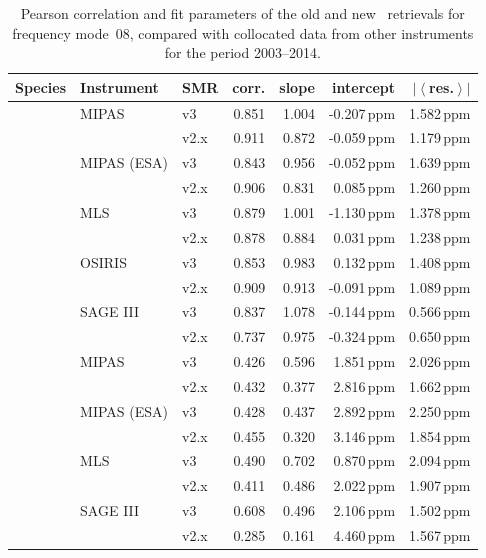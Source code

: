 \begin{table}[tbhp]
\centering
\caption{Pearson correlation and fit parameters of the old and new \smr\
retrievals for frequency mode~08, compared with collocated data from other
instruments for the period 2003--2014.}
\label{tab:fm08:stats}
\begin{tabular}{lllrrrr}
    \toprule
    \textbf{Species} & \textbf{Instrument} & \textbf{SMR} & \textbf{corr.} & \textbf{slope} & \textbf{intercept} & \textbf{$\left|\left<\right.\right.$res.$\left.\left.\right>\right|$} \\
    \midrule
    \chem{O3}   & MIPAS         & v3    & 0.851 & 1.004 & -0.207\,ppm   & 1.582\,ppm \\
                &               & v2.x  & 0.911 & 0.872 & -0.059\,ppm   & 1.179\,ppm \\
    \cline{2-7}
                & MIPAS (ESA)   & v3    & 0.843 & 0.956 & -0.052\,ppm   & 1.639\,ppm \\
                &               & v2.x  & 0.906 & 0.831 &  0.085\,ppm   & 1.260\,ppm \\
    \cline{2-7}
                & MLS           & v3    & 0.879 & 1.001 & -1.130\,ppm   & 1.378\,ppm \\
                &               & v2.x  & 0.878 & 0.884 &  0.031\,ppm   & 1.238\,ppm \\
    \cline{2-7}
                & OSIRIS        & v3    & 0.853 & 0.983 &  0.132\,ppm   & 1.408\,ppm \\
                &               & v2.x  & 0.909 & 0.913 & -0.091\,ppm   & 1.089\,ppm \\
    \cline{2-7}
                & SAGE III      & v3    & 0.837 & 1.078 & -0.144\,ppm   & 0.566\,ppm \\
                &               & v2.x  & 0.737 & 0.975 & -0.324\,ppm   & 0.650\,ppm \\
    \midrule
    \chem{H_2O} & MIPAS         & v3    & 0.426 & 0.596 & 1.851\,ppm    & 2.026\,ppm \\
                &               & v2.x  & 0.432 & 0.377 & 2.816\,ppm    & 1.662\,ppm \\
    \cline{2-7}
                & MIPAS (ESA)   & v3    & 0.428 & 0.437 & 2.892\,ppm    & 2.250\,ppm \\
                &               & v2.x  & 0.455 & 0.320 & 3.146\,ppm    & 1.854\,ppm \\
    \cline{2-7}
                & MLS           & v3    & 0.490 & 0.702 & 0.870\,ppm    & 2.094\,ppm \\
                &               & v2.x  & 0.411 & 0.486 & 2.022\,ppm    & 1.907\,ppm \\
    \cline{2-7}
                & SAGE III      & v3    & 0.608 & 0.496 & 2.106\,ppm    & 1.502\,ppm \\
                &               & v2.x  & 0.285 & 0.161 & 4.460\,ppm    & 1.567\,ppm \\
    \bottomrule
\end{tabular}
\end{table}

